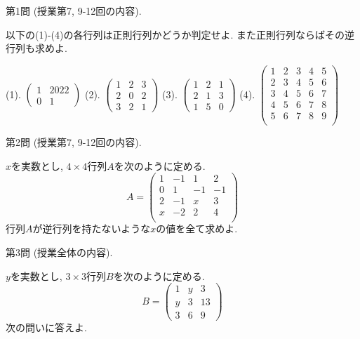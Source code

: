 \documentclass[dvipdfmx,a4paper,11pt]{article}
\theoremstyle{definition}
\begin{document}
 {\Large 第1問} (授業第7, 9-12回の内容).
 
 \vspace{11pt}
以下の(1)-(4)の各行列は正則行列かどうか判定せよ. また正則行列ならばその逆行列も求めよ.
 
  \vspace{11pt}
 (1).
 $
 \begin{pmatrix}
1& 2022 \\
0& 1
 \end{pmatrix}
 $
(2).
$
 \begin{pmatrix}
1 &2&3 \\
2 & 0 & 2\\
3&2 &1
 \end{pmatrix}
 $
(3).
$
 \begin{pmatrix}
1 &2&1 \\
2 & 1& 3\\
1&5 &0
 \end{pmatrix}
 $
 (4).
 $
 \begin{pmatrix}
 1& 2& 3  & 4&5\\
 2& 3& 4  & 5&6\\
 3& 4& 5 & 6&7\\
 4& 5& 6 & 7&8\\
 5& 6& 7 & 8&9\\
 \end{pmatrix}
 $

 \vspace{33pt}
 
{\Large 第2問} (授業第7, 9-12回の内容).
    \vspace{11pt}

$x$を実数とし, $4 \times 4$行列$A$を次のように定める.
 $$A=
  \begin{pmatrix}
1 &-1&1 &2\\
0 & 1&-1 &-1\\
2 &-1&x &3\\
x &-2&2&4\\
 \end{pmatrix}
 $$
行列$A$が逆行列を持たないような$x$の値を全て求めよ.
\vspace{33pt} 

   
   {\Large 第3問} (授業全体の内容).
    \vspace{11pt}
  
$y$を実数とし, $3 \times 3$行列$B$を次のように定める.
 $$B=
  \begin{pmatrix}
1 &y&3 \\
y & 3& 13\\
3&6 &9
 \end{pmatrix}
 $$
次の問いに答えよ.
     \vspace{11pt}
     
\end{document}
